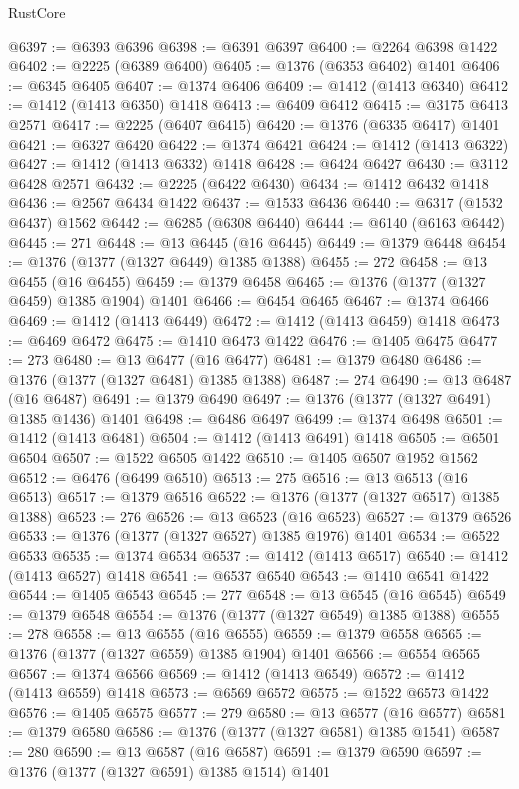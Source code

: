 \begin{lexlean}{RustCore}
\begin{coremodule}
@6397 := @6393 @6396
@6398 := @6391 @6397
@6400 := @2264 @6398 @1422
@6402 := @2225 (@6389 @6400)
@6405 := @1376 (@6353 @6402) @1401
@6406 := @6345 @6405
@6407 := @1374 @6406
@6409 := @1412 (@1413 @6340)
@6412 := @1412 (@1413 @6350) @1418
@6413 := @6409 @6412
@6415 := @3175 @6413 @2571
@6417 := @2225 (@6407 @6415)
@6420 := @1376 (@6335 @6417) @1401
@6421 := @6327 @6420
@6422 := @1374 @6421
@6424 := @1412 (@1413 @6322)
@6427 := @1412 (@1413 @6332) @1418
@6428 := @6424 @6427
@6430 := @3112 @6428 @2571
@6432 := @2225 (@6422 @6430)
@6434 := @1412 @6432 @1418
@6436 := @2567 @6434 @1422
@6437 := @1533 @6436
@6440 := @6317 (@1532 @6437) @1562
@6442 := @6285 (@6308 @6440)
@6444 := @6140 (@6163 @6442)
@6445 := 271
@6448 := @13 @6445 (@16 @6445)
@6449 := @1379 @6448
@6454 := @1376 (@1377 (@1327 @6449) @1385 @1388)
@6455 := 272
@6458 := @13 @6455 (@16 @6455)
@6459 := @1379 @6458
@6465 := @1376 (@1377 (@1327 @6459) @1385 @1904) @1401
@6466 := @6454 @6465
@6467 := @1374 @6466
@6469 := @1412 (@1413 @6449)
@6472 := @1412 (@1413 @6459) @1418
@6473 := @6469 @6472
@6475 := @1410 @6473 @1422
@6476 := @1405 @6475
@6477 := 273
@6480 := @13 @6477 (@16 @6477)
@6481 := @1379 @6480
@6486 := @1376 (@1377 (@1327 @6481) @1385 @1388)
@6487 := 274
@6490 := @13 @6487 (@16 @6487)
@6491 := @1379 @6490
@6497 := @1376 (@1377 (@1327 @6491) @1385 @1436) @1401
@6498 := @6486 @6497
@6499 := @1374 @6498
@6501 := @1412 (@1413 @6481)
@6504 := @1412 (@1413 @6491) @1418
@6505 := @6501 @6504
@6507 := @1522 @6505 @1422
@6510 := @1405 @6507 @1952 @1562
@6512 := @6476 (@6499 @6510)
@6513 := 275
@6516 := @13 @6513 (@16 @6513)
@6517 := @1379 @6516
@6522 := @1376 (@1377 (@1327 @6517) @1385 @1388)
@6523 := 276
@6526 := @13 @6523 (@16 @6523)
@6527 := @1379 @6526
@6533 := @1376 (@1377 (@1327 @6527) @1385 @1976) @1401
@6534 := @6522 @6533
@6535 := @1374 @6534
@6537 := @1412 (@1413 @6517)
@6540 := @1412 (@1413 @6527) @1418
@6541 := @6537 @6540
@6543 := @1410 @6541 @1422
@6544 := @1405 @6543
@6545 := 277
@6548 := @13 @6545 (@16 @6545)
@6549 := @1379 @6548
@6554 := @1376 (@1377 (@1327 @6549) @1385 @1388)
@6555 := 278
@6558 := @13 @6555 (@16 @6555)
@6559 := @1379 @6558
@6565 := @1376 (@1377 (@1327 @6559) @1385 @1904) @1401
@6566 := @6554 @6565
@6567 := @1374 @6566
@6569 := @1412 (@1413 @6549)
@6572 := @1412 (@1413 @6559) @1418
@6573 := @6569 @6572
@6575 := @1522 @6573 @1422
@6576 := @1405 @6575
@6577 := 279
@6580 := @13 @6577 (@16 @6577)
@6581 := @1379 @6580
@6586 := @1376 (@1377 (@1327 @6581) @1385 @1541)
@6587 := 280
@6590 := @13 @6587 (@16 @6587)
@6591 := @1379 @6590
@6597 := @1376 (@1377 (@1327 @6591) @1385 @1514) @1401

\end{coremodule}
\end{lexlean}
